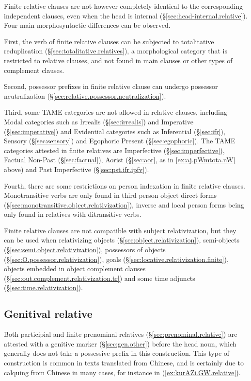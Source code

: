 Finite relative clauses are not however completely identical to the corresponding independent clauses, even when the head is internal (§\ref{sec:head-internal.relative}). Four main morphosyntactic differences can be observed.

First, the verb of finite relative clauses can be subjected to totalitative reduplication (§\ref{sec:totalitative.relatives}), a morphological category that is restricted to relative clauses, and not found in main clauses or other types of complement clauses.

Second, possessor prefixes in finite relative clause can undergo possessor neutralization (§\ref{sec:relative.possessor.neutralization}).

Third, some TAME categories are not allowed in relative clauses, including Modal categories such as Irrealis (§\ref{sec:irrealis}) and Imperative (§\ref{sec:imperative}) and Evidential categories such as Inferential (§\ref{sec:ifr}), Sensory (§\ref{sec:sensory}) and Egophoric Present (§\ref{sec:egophoric}). The TAME categories attested in finite relatives are Imperfective (§\ref{sec:imperfective}), Factual Non-Past (§\ref{sec:factual}), Aorist (§\ref{sec:aor}, as in \ref{ex:aj.pWmtota.nW} above) and Past Imperfective (§\ref{sec:pst.ifr.ipfv}).

Fourth, there are some restrictions on person indexation in finite relative claus\-es. Monotransitive verbs are only found in third person object direct forms (§\ref{sec:monotransitive.object.relativization}), inverse and local person forms being only found in relatives with ditransitive verbs.

Finite relative clauses are not compatible with subject relativization, but they can be used when relativizing objects (§\ref{sec:object.relativization}), semi-objects (§\ref{sec:semi.object.relativization}), possessors of objects (§\ref{sec:O.possessor.relativization}), goals (§\ref{sec:locative.relativization.finite}), objects embedded in object complement clauses (§\ref{sec:out.complement.relativization.tr}) and some time adjuncts (§\ref{sec:time.relativization}).

\subsection{Genitival relative} \label{sec:genitival.relatives}
Both participial and finite prenominal relatives (§\ref{sec:prenominal.relative}) are attested with a genitive marker  (§\ref{sec:gen.other}) before the head noun, which generally does not take a possessive prefix in this construction. This type of construction is common in texts translated from Chinese, and is certainly due to calquing from Chinese in many cases, for instance in (\ref{ex:kurAZi.GW.relative}).  

